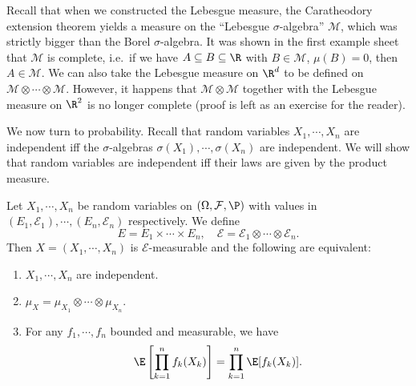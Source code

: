 \documentclass[a4paper]{article}
\begin{document}
Recall that when we constructed the Lebesgue measure, the Caratheodory extension theorem yields a measure on the ``Lebesgue $\sigma$-algebra'' $\mathcal{M}$, which was strictly bigger than the Borel $\sigma$-algebra. It was shown in the first example sheet that $\mathcal{M}$ is complete, i.e.\ if we have $A \subseteq B \subseteq \R$ with $B \in \mathcal{M}$, $\mu(B) = 0$, then $A \in \mathcal{M}$. We can also take the Lebesgue measure on $\R^d$ to be defined on $\mathcal{M} \otimes \cdots \otimes \mathcal{M}$. However, it happens that $\mathcal{M} \otimes \mathcal{M}$ together with the Lebesgue measure on $\R^2$ is no longer complete (proof is left as an exercise for the reader).

We now turn to probability. Recall that random variables $X_1, \cdots, X_n$ are independent iff the $\sigma$-algebras $\sigma(X_1), \cdots, \sigma(X_n)$ are independent. We will show that random variables are independent iff their laws are given by the product measure.

\begin{prop}
  Let $X_1, \cdots, X_n$ be random variables on $(\Omega, \mathcal{F}, \P)$ with values in $(E_1, \mathcal{E}_1), \cdots, (E_n, \mathcal{E}_n)$ respectively. We define
  \[
    E = E_1 \times \cdots \times E_n, \quad \mathcal{E} = \mathcal{E}_1 \otimes \cdots \otimes \mathcal{E}_n.
  \]
  Then $X = (X_1, \cdots, X_n)$ is $\mathcal{E}$-measurable and the following are equivalent:
  \begin{enumerate}
    \item $X_1, \cdots, X_n$ are independent.
    \item $\mu_X = \mu_{X_1}\otimes \cdots \otimes \mu_{X_n}$.
    \item For any $f_1, \cdots, f_n$ bounded and measurable, we have
      \[
        \E\left[\prod_{k = 1}^n f_k (X_k)\right] = \prod_{k = 1}^n \E[f_k(X_k)].
      \]
  \end{enumerate}
\end{prop}
\end{document}
